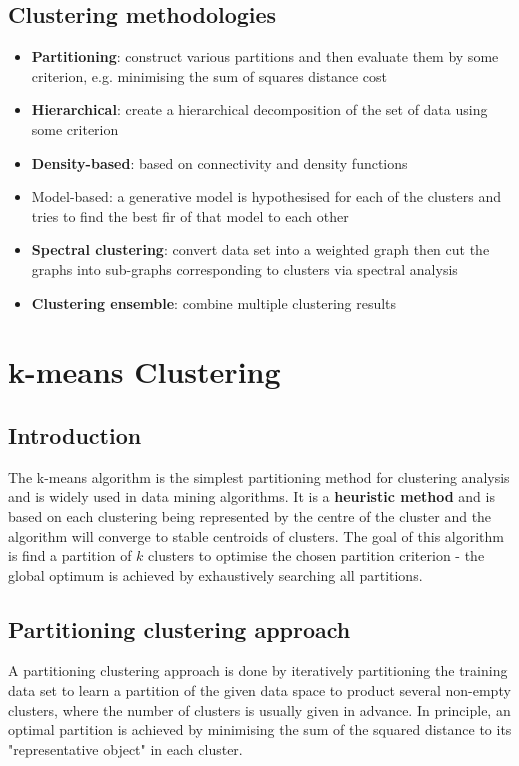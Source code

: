 \documentclass[11pt,fleqn]{book} %
\begin{document}
\section{Clustering methodologies}
\begin{itemize}
	\item \textbf{Partitioning}: construct various partitions and then evaluate them by some criterion, e.g. minimising the sum of squares distance cost
	\item \textbf{Hierarchical}: create a hierarchical decomposition of the set of data using some criterion
	\item \textbf{Density-based}: based on connectivity and density functions
	\item Model-based: a generative model is hypothesised for each of the clusters and tries to find the best fir of that model to each other
	\item \textbf{Spectral clustering}: convert data set into a weighted graph then cut the graphs into sub-graphs corresponding to clusters via spectral analysis
	\item \textbf{Clustering ensemble}: combine multiple clustering results
\end{itemize}



\chapter{k-means Clustering}

\section*{Introduction}
The k-means algorithm is the simplest partitioning method for clustering analysis and is widely used in data mining algorithms. It is a \textbf{heuristic method} and is based on each clustering being represented by the centre of the cluster and the algorithm will converge to stable centroids of clusters. The goal of this algorithm is find a partition of $k$ clusters to optimise the chosen partition criterion - the global optimum is achieved by exhaustively searching all partitions.

\section{Partitioning clustering approach}
A partitioning clustering approach is done by iteratively partitioning the training data set to learn a partition of the given data space to product several non-empty clusters, where the number of clusters is usually given in advance. In principle, an optimal partition is achieved by minimising the sum of the squared distance to its "representative object" in each cluster.
\end{document}

